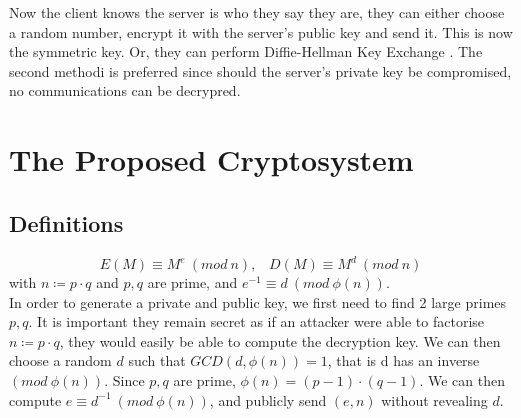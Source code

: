 \documentclass{article}
\begin{document}
Now the client knows the server is who they say they are,
they can either choose a random number, encrypt it with the server's public key and send it.
This is now the symmetric key.
Or, they can perform Diffie-Hellman Key Exchange \cite{Directions}.
The second methodi is preferred since should the server's private key be compromised,
no communications can be decrypred.
\newpage
\section{The Proposed Cryptosystem}
\subsection{Definitions}
\[ E(M) \equiv M^e \: (mod \: n),\;\;\; D(M) \equiv M^d \: (mod \: n)\]
with $ n \coloneqq p \cdot q $ and $p, q$ are prime, and $e^{-1} \equiv d \: (mod \: \phi (n))$. \\
In order to generate a private and public key, we first need to find 2 large primes $p, q$.
It is important they remain secret as if an attacker were able to factorise
$ n \coloneqq p \cdot q $,
they would easily be able to compute the decryption key. We can then choose a random $d$ such that $GCD(d, \phi (n)) = 1$,
that is d has an inverse $(mod \: \phi(n))$.
Since $p, q$ are prime, $\phi(n) = (p-1) \cdot (q-1) $.
We can then compute $e \equiv d^{-1} \: (mod \: \phi(n))$,
and publicly send $(e, n)$ without revealing $d$.
\end{document}
